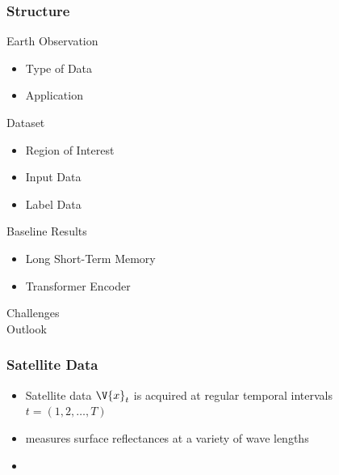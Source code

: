 \documentclass[%
  aspectratio=169,
  9pt,
  USenglish,
  titlegraphic, %
  affiliationintitlepagehead,
  affiliation,
]{beamer}
\begin{document}
\begin{frame}
	\frametitle{Structure}
	
	Earth Observation
	\begin{itemize}
		\item Type of Data
		\item Application
	\end{itemize}

	Dataset
	\begin{itemize}
		\item Region of Interest
		\item Input Data
		\item Label Data
	\end{itemize}

	Baseline Results
	\begin{itemize}
		\item Long Short-Term Memory
		\item Transformer Encoder
	\end{itemize}

	Challenges \\
	Outlook
\end{frame}

\begin{frame}
	\frametitle{Satellite Data}
	
	\begin{itemize}
		\item Satellite data $\V{x}_t$ is acquired at regular temporal intervals $t = (1,2,\dots, T)$
		\item measures surface reflectances at a variety of wave lengths
		\item 
	\end{itemize}
	
\end{frame}
\end{document}
